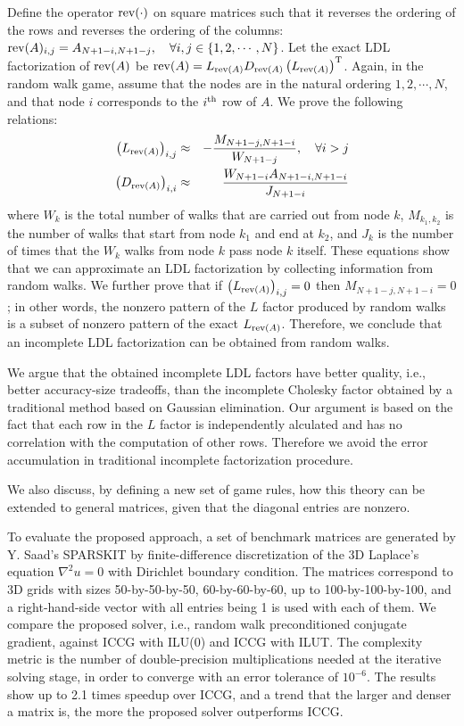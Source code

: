 \documentclass{report}
\begin{document}
Define the operator ${\rm rev}(\cdot)$ on square matrices such that it
reverses the ordering of the rows and reverses the ordering of the
columns: ${\rm rev}(A)_{i,j}=A_{N+1-i,N+1-j} , \quad \forall i,j \in \{
1,2,\cdots,N \}$.
Let the exact LDL factorization of ${\rm rev}(A)$ be
${\rm rev}(A) = L_{{\rm rev}(A)} D_{{\rm rev}(A)} \left( L_{{\rm rev}(A)}
\right)^{\rm T}$.
Again, in the random walk game, assume that the nodes are in the natural
ordering $1,2,\cdots,N$, and that node $i$ corresponds to the $i^{\rm
th}$ row of $A$.
We prove the following relations:
\begin{eqnarray}
\left( L_{{\rm rev}(A)} \right)_{i,j} & \approx & -
\frac{M_{N+1-j,N+1-i}}{W_{N+1-j}}, \quad\forall i>j
\\
\left( D_{{\rm rev}(A)} \right)_{i,i} & \approx & \frac{W_{N+1-i}
A_{N+1-i,N+1-i}} {J_{N+1-i}}
\end{eqnarray}
where $W_k$ is the total number of walks that are carried out from node
$k$, $M_{k_1,k_2}$ is the number of walks that start from node $k_1$ and
end at $k_2$, and $J_{k}$ is the number of times that the $W_k$ walks
from node $k$ pass node $k$ itself.
These equations show that we can approximate an LDL factorization by
collecting information from random walks.
We further prove that if $\left( L_{{\rm rev}(A)} \right)_{i,j} = 0$ then
$M_{N+1-j,N+1-i} = 0$; in other words, the nonzero pattern of the $L$
factor produced by random walks is a subset of nonzero pattern of the
exact $L_{{\rm rev}(A)}$. Therefore, we conclude that an incomplete LDL
factorization can be obtained from random walks.

We argue that the obtained incomplete LDL factors have better quality,
i.e., better accuracy-size tradeoffs, than the incomplete Cholesky factor
obtained by a traditional method based on Gaussian elimination. Our
argument is based on the
fact that each row in the $L$ factor is independently alculated and has
no correlation with the computation of other rows. Therefore we avoid the
error accumulation in traditional incomplete factorization procedure.

We also discuss, by defining a new set of game rules, how this theory can
be extended to general matrices, given that the diagonal entries are
nonzero.

To evaluate the proposed approach, a set of benchmark matrices are
generated by Y. Saad's SPARSKIT by finite-difference discretization of
the 3D Laplace's equation $\nabla ^2 u = 0$ with Dirichlet boundary
condition. The matrices correspond
to 3D grids with sizes 50-by-50-by-50, 60-by-60-by-60, up to
100-by-100-by-100, and a right-hand-side vector with all entries being 1
is used with each of them. We compare the proposed solver, i.e., random
walk preconditioned conjugate gradient, against ICCG with ILU(0) and ICCG
with ILUT. The complexity metric is the number of double-precision
multiplications needed at the iterative solving stage, in order
to converge with an error tolerance of $10^{-6}$. The results show up to
2.1 times speedup over ICCG, and a trend that the larger and denser a
matrix is, the more the proposed solver outperforms ICCG.
\end{document}
